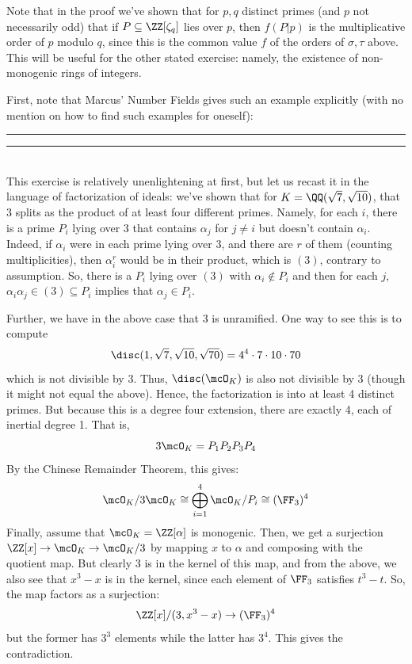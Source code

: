 Note that in the proof we've shown that for $p,q$ distinct primes (and $p$ not necessarily odd) that if $P \subseteq \ZZ[\zeta_q]$ lies over $p$, then $f(P|p)$ is the multiplicative order of $p$ modulo $q$, since this is the common value $f$ of the orders of $\sigma,\tau$ above. This will be useful for the other stated exercise: namely, the existence of non-monogenic rings of integers.

First, note that Marcus' Number Fields gives such an example explicitly (with no mention on how to find such examples for oneself): \\

\hrule



\hrule \\

This exercise is relatively unenlightening at first, but let us recast it in the language of factorization of ideals: we've shown that for $K = \QQ(\sqrt{7},\sqrt{10})$, that 3 splits as the product of at least four different primes. Namely, for each $i$, there is a prime $P_i$ lying over 3 that contains $\alpha_j$ for $j \neq i$ but doesn't contain $\alpha_i$. Indeed, if $\alpha_i$ were in each prime lying over $3$, and there are $r$ of them (counting multiplicities), then $\alpha_i^r$ would be in their product, which is $(3)$, contrary to assumption. So, there is a $P_i$ lying over $(3)$ with $\alpha_i \notin P_i$ and then for each $j$, $\alpha_i\alpha_j \in (3) \subseteq P_i$ implies that $\alpha_j \in P_i$.

Further, we have in the above case that 3 is unramified. One way to see this is to compute
\[ \disc(1,\sqrt{7},\sqrt{10},\sqrt{70}) = 4^4 \cdot 7 \cdot 10 \cdot 70 \]
which is not divisible by $3$. Thus, $\disc(\mcO_K)$ is also not divisible by 3 (though it might not equal the above). Hence, the factorization is into at least 4 distinct primes. But because this is a degree four extension, there are exactly 4, each of inertial degree 1. That is,
\[ 3\mcO_K = P_1P_2P_3P_4 \]
By the Chinese Remainder Theorem, this gives:
\[ \mcO_K/3\mcO_K \cong \bigoplus_{i=1}^4 \mcO_K/P_i \cong (\FF_3)^4 \]
Finally, assume that $\mcO_K = \ZZ[\alpha]$ is monogenic. Then, we get a surjection $\ZZ[x] \to \mcO_K \to \mcO_K/3$ by mapping $x$ to $\alpha$ and composing with the quotient map. But clearly 3 is in the kernel of this map, and from the above, we also see that $x^3-x$ is in the kernel, since each element of $\FF_3$ satisfies $t^3-t$. So, the map factors as a surjection:
\[ \ZZ[x]/(3,x^3-x) \to (\FF_3)^4 \]
but the former has $3^3$ elements while the latter has $3^4$. This gives the contradiction.

